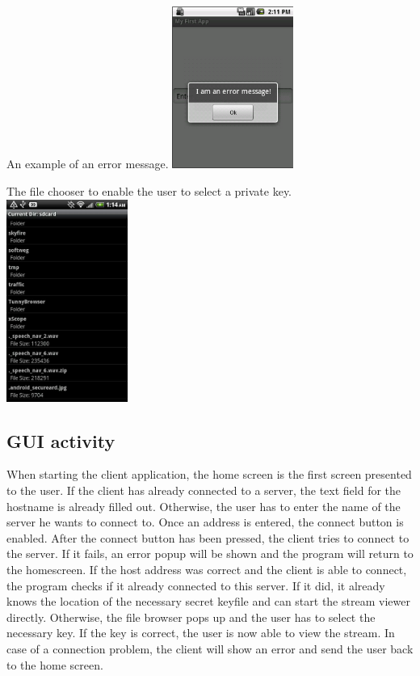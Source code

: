 \documentclass[a4paper,10pt]{scrartcl}
\begin{document}
\begin{illustration}{An example of an error message.}
\includegraphics[width=150px]{figures/images/error.png}
\end{illustration}
\begin{illustration}{The file chooser to enable the user to select a private key.}
\includegraphics[width=150px]{figures/images/fileChooser.png}
\end{illustration}

\clearpage


\subsection{GUI activity}
When starting the client application, the home screen is the first screen presented to the user.
If the client has already connected to a server, the text field for the hostname is already filled out.
Otherwise, the user has to enter the name of the server he wants to connect to. Once an address is entered,
the connect button is enabled. After the connect button has been pressed, the client tries to connect to
the server. If it fails, an error popup will be shown and the program will return to the homescreen.
If the host address was correct and the client is able to connect, the program checks if it already connected
to this server. If it did, it already knows the location of the necessary secret keyfile and can start the stream viewer
directly. Otherwise, the file browser pops up and the user has to select the necessary key. If the key is correct,
the user is now able to view the stream. In case of a connection problem, the client will show an error and
send the user back to the home screen.
\end{document}
